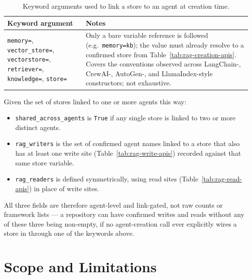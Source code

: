 \begin{table}[htbp]
\centering
\footnotesize
\renewcommand{\arraystretch}{0.9}
\caption{Keyword arguments used to link a store to an agent at creation time.}
\label{tab:store-agent-linking}
\begin{tabular}{@{}p{}p{}@{}}
\toprule
\textbf{Keyword argument} & \textbf{Notes} \\
\midrule
\texttt{memory=}, \texttt{vector\_store=}, \texttt{vectorstore=}, \texttt{retriever=}, \texttt{knowledge=}, \texttt{store=} & Only a bare variable reference is followed (e.g.\ \texttt{memory=kb}); the value must already resolve to a confirmed store from Table~\ref{tab:rag-creation-apis}. Covers the conventions observed across LangChain-, CrewAI-, AutoGen-, and LlamaIndex-style constructors; not exhaustive. \\
\bottomrule
\end{tabular}
\end{table}

Given the set of stores linked to one or more agents this way:
\begin{itemize}
  \item \texttt{shared\_across\_agents} is \texttt{True} if any single store is linked to two or more distinct agents.
  \item \texttt{rag\_writers} is the set of confirmed agent names linked to a store that also has at least one write site (Table~\ref{tab:rag-write-apis}) recorded against that same store variable.
  \item \texttt{rag\_readers} is defined symmetrically, using read sites (Table~\ref{tab:rag-read-apis}) in place of write sites.
\end{itemize}
All three fields are therefore agent-level and link-gated, not raw counts or framework lists --- a repository can have confirmed writes and reads without any of these three being non-empty, if no agent-creation call ever explicitly wires a store in through one of the keywords above.

\section{Scope and Limitations}
\label{sec:limitations}
 
